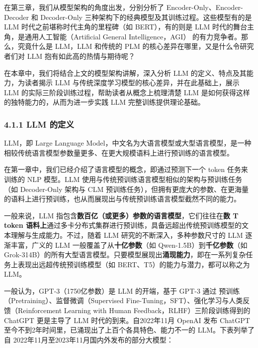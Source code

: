 \documentclass[12pt,a4paper]{book}
\begin{document}
在第三章，我们从模型架构的角度出发，分别分析了
Encoder-Only、Encoder-Decoder 和 Decoder-Only
三种架构下的经典模型及其训练过程。这些模型有的是 LLM
时代之前堪称时代主角的里程碑（如 BERT），有的则是 LLM
时代的舞台主角，是通用人工智能（Artificial General Intelligence，AGI）
的有力竞争者。那么，究竟什么是 LLM，LLM 和传统的 PLM
的核心差异在哪里，又是什么令研究者们对 LLM 抱有如此高的热情与期待呢？

在本章中，我们将结合上文的模型架构讲解，深入分析 LLM
的定义、特点及其能力，为读者揭示 LLM
与传统深度学习模型的核心差异，并在此基础上，展示 LLM
的实际三阶段训练过程，帮助读者从概念上梳理清楚 LLM
是如何获得这样的独特能力的，从而为进一步实践 LLM 完整训练提供理论基础。

\subsubsection{4.1.1 LLM 的定义}\label{llm-ux7684ux5b9aux4e49}

LLM，即 Large Language
Model，中文名为大语言模型或大型语言模型，是一种相较传统语言模型参数量更多、在更大规模语料上进行预训练的语言模型。

在第一章中，我们已经介绍了语言模型的概念，即通过预测下一个 token
任务来训练的 NLP 模型。LLM
使用与传统预训练语言模型相似的架构与预训练任务（如 Decoder-Only 架构与
CLM
预训练任务），但拥有更庞大的参数、在更海量的语料上进行预训练，也从而展现出与传统预训练语言模型截然不同的能力。

一般来说，LLM
指包含\textbf{数百亿（或更多）参数的语言模型}，它们往往在\textbf{数 T
token
语料上}通过多卡分布式集群进行预训练，具备远超出传统预训练模型的文本理解与生成能力。不过，随着
LLM 研究的不断深入，多种参数尺寸的 LLM 逐渐丰富，广义的 LLM
一般覆盖了从\textbf{十亿参数}（如 Qwen-1.5B）到\textbf{千亿参数}（如
Grok-314B）的所有大型语言模型。只要模型展现出\textbf{涌现能力}，即在一系列复杂任务上表现出远超传统预训练模型（如
BERT、T5）的能力与潜力，都可以称之为 LLM。

一般认为，GPT-3（1750亿参数）是 LLM 的开端，基于 GPT-3 通过
预训练（Pretraining）、监督微调（Supervised
Fine-Tuning，SFT）、强化学习与人类反馈（Reinforcement Learning with
Human Feedback，RLHF）三阶段训练得到的 ChatGPT 更是主导了 LLM
时代的到来。自2022年11月 OpenAI 发布 ChatGPT
至今不到2年时间里，已涌现出了上百个各具特色、能力不一的
LLM。下表列举了自 2022年11月至2023年11月国内外发布的部分大模型：
\end{document}
